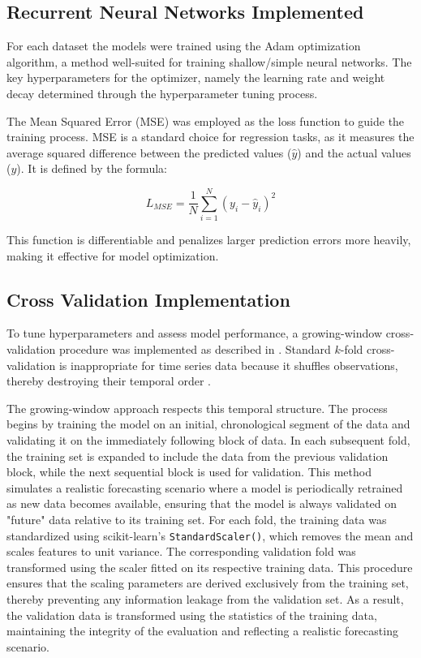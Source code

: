 \documentclass[conference, 10pt]{IEEEtran}
\begin{document}
\subsection{Recurrent Neural Networks Implemented}
For each dataset the models were trained using the Adam optimization algorithm, a method well-suited for training
shallow/simple neural networks. The key hyperparameters for the optimizer, namely the learning rate and weight decay
determined through the hyperparameter tuning process.

The Mean Squared Error (MSE) was employed as the loss function to guide the training process. MSE is a standard choice
for regression tasks, as it measures the average squared difference between the predicted values ($\hat{y}$) and the actual
values ($y$). It is defined by the formula:

$$L_{MSE} = \frac{1}{N} \sum_{i=1}^{N} (y_i - \hat{y}_i)^2$$ 

This function is differentiable and penalizes larger prediction errors more heavily, making it effective for model optimization.

\subsection{Cross Validation Implementation}
To tune hyperparameters and assess model performance, a growing-window cross-validation procedure was implemented as
described in \cite{CrossValidationTimeseries}. Standard $k$-fold cross-validation is inappropriate for time series data
because it shuffles observations, thereby destroying their temporal order \cite{CrossValidationTimeseries}.

The growing-window approach respects this temporal structure. The process begins by training the model on an initial,
chronological segment of the data and validating it on the immediately following block of data. In each subsequent fold,
the training set is expanded to include the data from the previous validation block, while the next sequential block is
used for validation. This method simulates a realistic forecasting scenario where a model is periodically retrained as
new data becomes available, ensuring that the model is always validated on "future" data relative to its training set.
For each fold, the training data was standardized using scikit-learn's \texttt{StandardScaler()}, which removes the mean
and scales features to unit variance. The corresponding validation fold was transformed using the scaler fitted on its
respective training data. This procedure ensures that the scaling parameters are derived exclusively from the training
set, thereby preventing any information leakage from the validation set. As a result, the validation data is transformed
using the statistics of the training data, maintaining the integrity of the evaluation and reflecting a realistic
forecasting scenario.
\end{document}
